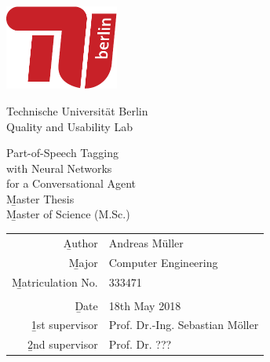 
\pagestyle{empty}

\clearscrheadings\clearscrplain
\begin{center}
\includegraphics[width=0.28\textwidth]{images/logo_tu_berlin}
\vspace{8mm}

{\huge Technische Universität Berlin}\\
\vspace{2mm}
{\large Quality and Usability Lab}\\
\vspace{11mm}

{\Huge Part-of-Speech Tagging\\[-2mm] with Neural Networks\\[-2mm] for a Conversational Agent\\}
\vspace{20mm}
{\Huge \b{Master Thesis}}\\
{\b{Master of Science (M.Sc.)}}\\
\vspace{24mm}
\begin{tabular}{rl}
  \b{Author} & Andreas Müller\\
  \b{Major} & Computer Engineering\\
  \b{Matriculation No.} & 333471\\
   & \\
  \b{Date} & 18th May 2018 \\
  \b{1st supervisor} & Prof. Dr.-Ing. Sebastian Möller \\
  \b{2nd supervisor} & Prof. Dr. ??? \\
\end{tabular}

\end{center}
\clearpage
\pagestyle{scrheadings} %

